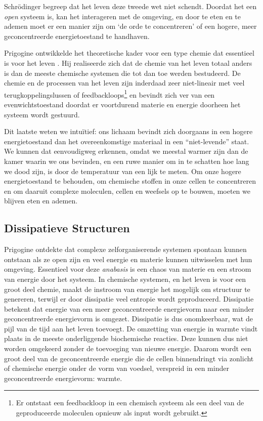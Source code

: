 \documentclass[
  11pt,
]{book}
\begin{document}
Schrödinger begreep dat het leven deze tweede wet niet schendt. Doordat het een \emph{open} systeem is, kan het interageren met de omgeving, en door te eten en te ademen moet er een manier zijn om `de orde te concentreren' of een hogere, meer geconcentreerde energietoestand te handhaven.

Prigogine ontwikkelde het theoretische kader voor een type chemie dat essentieel is voor het leven \citep{prigogineStengers1984}. Hij realiseerde zich dat de chemie van het leven totaal anders is dan de meeste chemische systemen die tot dan toe werden bestudeerd. De chemie en de processen van het leven zijn inderdaad zeer niet-lineair met veel terugkoppelingslussen of feedbackloops\footnote{Er ontstaat een feedbackloop in een chemisch systeem als een deel van de geproduceerde moleculen opnieuw als input wordt gebruikt.} en bevindt zich ver van een evenwichtstoestand doordat er voortdurend materie en energie doorheen het systeem wordt gestuurd.

Dit laatste weten we intuïtief: ons lichaam bevindt zich doorgaans in een hogere energietoestand dan het overeenkomstige materiaal in een ``niet-levende'' staat. We kunnen dat eenvoudigweg erkennen, omdat we meestal warmer zijn dan de kamer waarin we ons bevinden, en een ruwe manier om in te schatten hoe lang we dood zijn, is door de temperatuur van een lijk te meten. Om onze hogere energietoestand te behouden, om chemische stoffen in onze cellen te concentreren en om daaruit complexe moleculen, cellen en weefsels op te bouwen, moeten we blijven eten en ademen.

\pagebreak

\hypertarget{dissipatieve-structuren}{%
\subsection{Dissipatieve Structuren}\label{dissipatieve-structuren}}

Prigogine ontdekte dat complexe zelforganiserende systemen spontaan kunnen ontstaan als ze open zijn en veel energie en materie kunnen uitwisselen met hun omgeving. Essentieel voor deze \emph{anabasis} is een chaos van materie en een stroom van energie door het systeem. In chemische systemen, en het leven is voor een groot deel chemie, maakt de instroom van energie het mogelijk om structuur te genereren, terwijl er door dissipatie veel entropie wordt geproduceerd. Dissipatie betekent dat energie van een meer geconcentreerde energievorm naar een minder geconcentreerde energievorm is omgezet. Dissipatie is dus onomkeerbaar, wat de pijl van de tijd aan het leven toevoegt. De omzetting van energie in warmte vindt plaats in de meeste onderliggende biochemische reacties. Deze kunnen dus niet worden omgekeerd zonder de toevoeging van nieuwe energie. Daarom wordt een groot deel van de geconcentreerde energie die de cellen binnendringt via zonlicht of chemische energie onder de vorm van voedsel, verspreid in een minder geconcentreerde energievorm: warmte.
\end{document}
